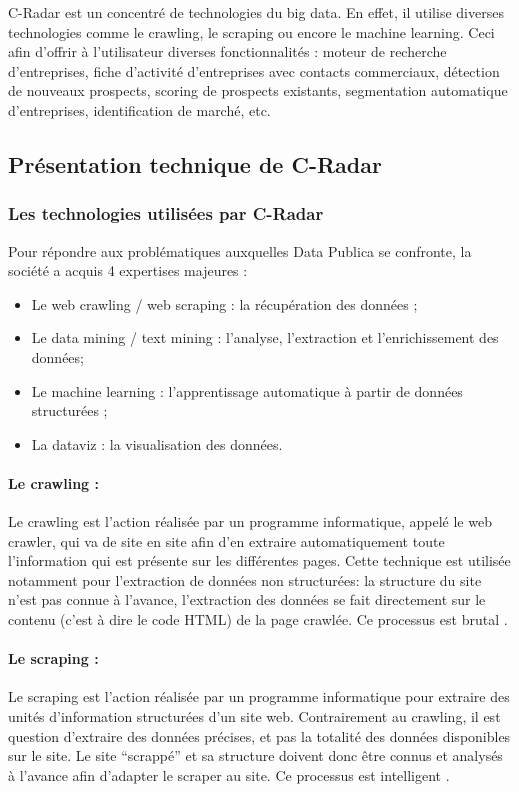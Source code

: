         C-Radar est un concentré de technologies du big data. En effet, il utilise diverses technologies comme le crawling, le scraping ou encore le machine learning. Ceci afin d'offrir à l'utilisateur diverses fonctionnalités : moteur de recherche d'entreprises, fiche d'activité d'entreprises avec contacts commerciaux, détection de nouveaux prospects, scoring de prospects existants, segmentation automatique d'entreprises, identification de marché, etc.

    \subsection{Présentation technique de C-Radar}
        \subsubsection{Les technologies utilisées par C-Radar}
            Pour répondre aux problématiques auxquelles Data Publica se confronte, la société a acquis 4 expertises majeures :
            \begin{itemize}
                \item Le web crawling / web scraping : la récupération des données ;
                \item Le data mining / text mining : l'analyse, l’extraction et l’enrichissement des données;
                \item Le machine learning : l'apprentissage automatique à partir de données structurées ;
                \item La dataviz : la visualisation des données.
            \end{itemize}

            \paragraph{Le crawling :}
                Le crawling est l’action réalisée par un programme informatique, appelé le web crawler, qui va de site en site afin d’en extraire automatiquement toute l’information qui est présente sur les différentes pages. Cette technique est utilisée notamment pour l’extraction de données non structurées: la structure du site n’est pas connue à l’avance, l’extraction des données se fait directement sur le contenu (c’est à dire le code HTML) de la page crawlée. Ce processus est \og brutal \fg.

            \paragraph{Le scraping :}
                Le scraping est l’action réalisée par un programme informatique pour extraire des unités d’information structurées d’un site web. Contrairement au crawling, il est question d’extraire des données précises, et pas la totalité des données disponibles sur le site. Le site “scrappé” et sa structure doivent donc être connus et analysés à l’avance afin d’adapter le scraper au site. Ce processus est \og intelligent \fg.

